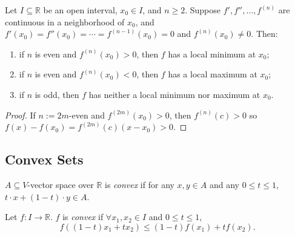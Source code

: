 \begin{theorem}
    Let $I \subseteq \mathbb{R}$ be an open interval, $x_0 \in I$, and $n \geq 2$. Suppose $f', f'', \dots, f^{(n)}$ are continuous in a neighborhood of $x_0$, and $f'(x_0) = f''(x_0) = \cdots = f^{(n-1)}(x_0) = 0$ and $f^{(n)}(x_0) \neq 0$. Then:
    \begin{enumerate}
        \item if $n$ is even and $f^{(n)}(x_0) > 0$, then $f$ has a local minimum at $x_0$;
        \item if $n$ is even and $f^{(n)}(x_0) < 0$, then $f$ has a local maximum at $x_0$;
        \item if $n$ is odd, then $f$ has neither a local minimum nor maximum at $x_0$.
    \end{enumerate}
\end{theorem}


\begin{proof}
    If $n := 2m$-even and $f^{(2m)}(x_0) > 0$, then $f^{(n)}(c) > 0$ so $f(x) - f(x_0) = f^{(2m)}(c)(x-x_0) > 0$.
\end{proof}

\subsection{Convex Sets}

\begin{definition}
    $A \subseteq V$-vector space over $\mathbb{R}$ is \emph{convex} if for any $x,y \in A$ and any $0 \leq t \leq 1$, $t \cdot x + (1 - t)\cdot y \in A$.
\end{definition}

\begin{definition}
    Let $f : I \to \mathbb{R}$. $f$ is \emph{convex} if $\forall x_1, x_2 \in I$ and $0 \leq t \leq 1$, $$f((1-t)x_1 + tx_2) \leq (1-t)f(x_1) + tf(x_2).$$
\end{definition}